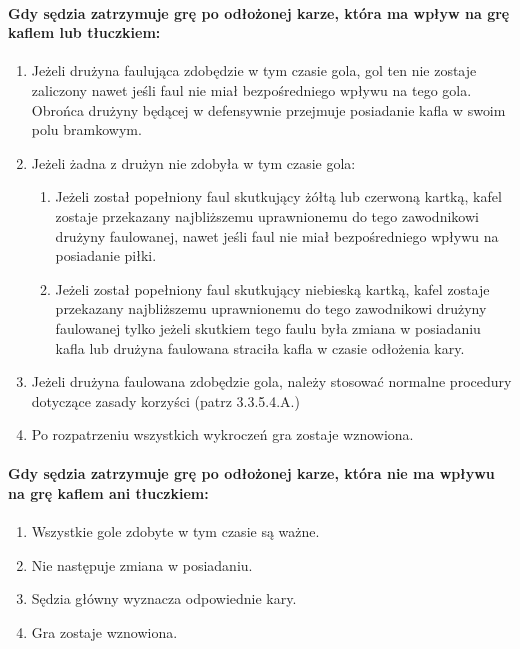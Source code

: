\documentclass[12pt]{article}
\begin{document}
\paragraph{Gdy sędzia zatrzymuje grę po odłożonej karze, która ma
	wpływ na grę kaflem lub tłuczkiem:}

\begin{enumerate}
	\item
	      Jeżeli drużyna faulująca zdobędzie w tym czasie gola, gol ten nie
	      zostaje zaliczony nawet jeśli faul nie miał bezpośredniego wpływu na
	      tego gola. Obrońca drużyny będącej w defensywnie przejmuje posiadanie
	      kafla w swoim polu bramkowym.
	\item
	      Jeżeli żadna z drużyn nie zdobyła w tym czasie gola:

	      \begin{enumerate}
		      \item
		            Jeżeli został popełniony faul skutkujący żółtą lub czerwoną kartką,
		            kafel zostaje przekazany najbliższemu uprawnionemu do tego
		            zawodnikowi drużyny faulowanej, nawet jeśli faul nie miał
		            bezpośredniego wpływu na posiadanie piłki.
		      \item
		            Jeżeli został popełniony faul skutkujący niebieską kartką, kafel
		            zostaje przekazany najbliższemu uprawnionemu do tego zawodnikowi
		            drużyny faulowanej tylko jeżeli skutkiem tego faulu była zmiana w
		            posiadaniu kafla lub drużyna faulowana straciła kafla w czasie
		            odłożenia kary.
	      \end{enumerate}
	\item
	      Jeżeli drużyna faulowana zdobędzie gola, należy stosować normalne
	      procedury dotyczące zasady korzyści (patrz 3.3.5.4.A.)
	\item
	      Po rozpatrzeniu wszystkich wykroczeń gra zostaje wznowiona.
\end{enumerate}

\paragraph{Gdy sędzia zatrzymuje grę po odłożonej karze, która nie
	ma wpływu na grę kaflem ani tłuczkiem:}

\begin{enumerate}
	\item
	      Wszystkie gole zdobyte w tym czasie są ważne.
	\item
	      Nie następuje zmiana w posiadaniu.
	\item
	      Sędzia główny wyznacza odpowiednie kary.
	\item
	      Gra zostaje wznowiona.
\end{enumerate}
\end{document}
